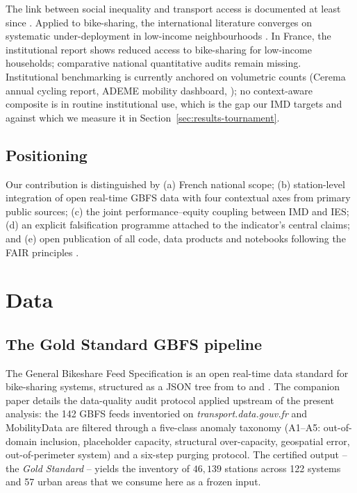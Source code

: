\documentclass[11pt,a4paper]{article}
\begin{document}
The link between social inequality and transport access is
documented at least since \citet{Hodge1995}. Applied to
bike-sharing, the international literature converges on systematic
under-deployment in low-income neighbourhoods \citep{Smith2015,
McNeil2017, Hosford2018, Caspi2021}. In France, the
\citet{Cerema2022} institutional report shows reduced access to
bike-sharing for low-income households; comparative national
quantitative audits remain missing. Institutional benchmarking is
currently anchored on volumetric counts (Cerema annual cycling
report, ADEME mobility dashboard, \citet{Mobi2024}); no
context-aware composite is in routine institutional use, which is
the gap our IMD targets and against which we measure it in
Section~\ref{sec:results-tournament}.

\subsection{Positioning}

Our contribution is distinguished by (a) French national scope;
(b) station-level integration of open real-time GBFS data with
four contextual axes from primary public sources; (c) the joint
performance--equity coupling between IMD and IES; (d) an explicit
falsification programme attached to the indicator's central
claims; and (e) open publication of all code, data products and
notebooks following the FAIR principles \citep{Wilkinson2016}.

\section{Data}
\label{sec:data}

\subsection{The Gold Standard GBFS pipeline}

The General Bikeshare Feed Specification \citep{Mobi2024} is an
open real-time data standard for bike-sharing systems, structured
as a JSON tree from  to
 and .
The companion \citet{Fosse2026gold} paper details the data-quality
audit protocol applied upstream of the present analysis: the 142
GBFS feeds inventoried on \emph{transport.data.gouv.fr} and
MobilityData are filtered through a five-class anomaly taxonomy
(A1--A5: out-of-domain inclusion, placeholder capacity, structural
over-capacity, geospatial error, out-of-perimeter system) and a
six-step purging protocol. The certified output -- the
\emph{Gold Standard} -- yields the inventory of $46{,}139$
stations across 122 systems and 57 urban areas that we consume
here as a frozen input.
\end{document}
